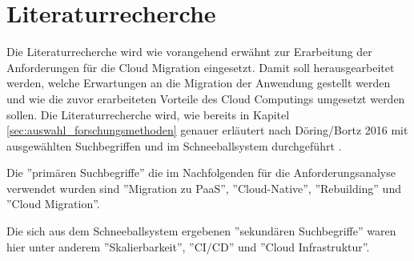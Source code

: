 \section{Literaturrecherche}
Die Literaturrecherche wird wie vorangehend erwähnt zur Erarbeitung der Anforderungen für die Cloud Migration eingesetzt. Damit soll herausgearbeitet werden, welche Erwartungen an die Migration der Anwendung gestellt werden und wie die zuvor erarbeiteten Vorteile des Cloud Computings umgesetzt werden sollen. Die Literaturrecherche wird, wie bereits in Kapitel \ref{sec:auswahl_forschungsmethoden} genauer erläutert nach Döring/Bortz 2016 mit ausgewählten Suchbegriffen und im Schneeballsystem durchgeführt \cite[S. 158ff]{Doering2016}.

Die ''primären Suchbegriffe'' \cite[S. 158]{Doering2016} die im Nachfolgenden für die Anforderungsanalyse verwendet wurden sind ''Migration zu PaaS'', ''Cloud-Native'', ''Rebuilding'' und ''Cloud Migration''.

Die sich aus dem Schneeballsystem ergebenen ''sekundären Suchbegriffe'' \cite[S. 158]{Doering2016} waren hier unter anderem ''Skalierbarkeit'', ''CI/CD'' und ''Cloud Infrastruktur''. \pagebreak